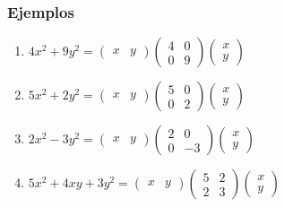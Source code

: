 \begin{frame}\frametitle{Ejemplos}

\begin{enumerate}
	\item $4x^2 +9y^2 = \left(\begin{array}{cc} x &y \end{array}\right) \left(\begin{array}{cc}4&0\\[1mm]0&9\end{array}\right) \left(\begin{array}{c}x\\[1mm] y\end{array}\right)$%
	
	\vspace{5mm}
	\item $5x^2 +2y^2 = \left(\begin{array}{cc} x &y \end{array}\right) \left(\begin{array}{cc}5&0\\[1mm]0&2\end{array}\right) \left(\begin{array}{c}x\\[1mm] y\end{array}\right)$%
	
	\vspace{5mm}
	\item $2x^2 - 3y^2 = \left(\begin{array}{cc} x &y \end{array}\right) \left(\begin{array}{cc}2&0\\[1mm]0&-3\end{array}\right) \left(\begin{array}{c}x\\[1mm] y\end{array}\right)$%
	
	\vspace{5mm}
	\item $5x^2 +4xy+3y^2 = \left(\begin{array}{cc} x &y \end{array}\right) \left(\begin{array}{cc}5&2\\[1mm]2&3\end{array}\right) \left(\begin{array}{c}x\\[1mm] y\end{array}\right)$%
	

\end{enumerate}
\end{frame}
